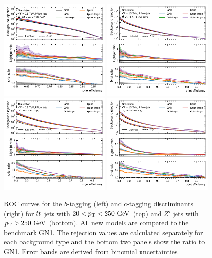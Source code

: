 \begin{figure}[ht]
    \centering
    \includegraphics[width=0.49\textwidth]{figures/flavour_tagging/b_roc_ttbar_large.pdf}
    \includegraphics[width=0.49\textwidth]{figures/flavour_tagging/c_roc_ttbar_large.pdf}
    \includegraphics[width=0.49\textwidth]{figures/flavour_tagging/b_roc_zprime_large.pdf}
    \includegraphics[width=0.49\textwidth]{figures/flavour_tagging/c_roc_zprime_large.pdf}
    \caption{ROC curves for the $b$-tagging (left) and $c$-tagging discriminants (right) for $t\bar{t}$ jets with $20 < \pt < 250~\GeV$ (top) and $Z'$ jets with $\pt > 250~\GeV$ (bottom).
        All new models are compared to the benchmark GN1. The rejection values are calculated separately for each background type and the bottom two panels show the ratio to GN1. Error bands are derived from binomial uncertainties.}
    \label{fig:large_rocs}
\end{figure}

